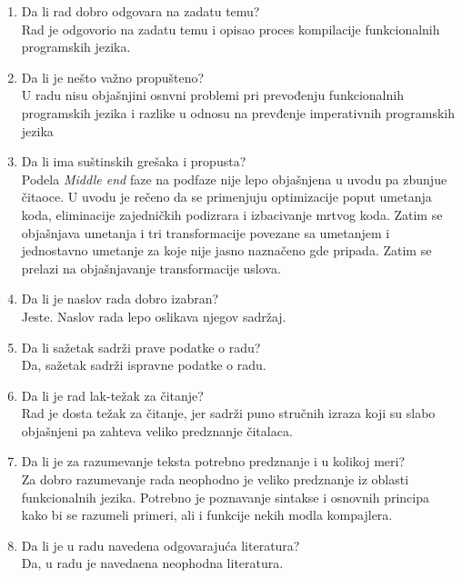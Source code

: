 \documentclass[a4paper]{report}
\begin{document}
	\begin{enumerate}
		
		\item Da li rad dobro odgovara na zadatu temu?\\
		Rad je odgovorio na zadatu temu i opisao proces kompilacije funkcionalnih programskih jezika.
		
		\item Da li je nešto važno propušteno?\\
		U radu nisu objašnjini osnvni problemi pri prevođenju funkcionalnih programskih jezika i razlike u odnosu na prevđenje imperativnih programskih jezika
		
		\item Da li ima suštinskih grešaka i propusta?\\
		Podela \emph{Middle end} faze na podfaze nije lepo objašnjena u uvodu pa zbunjue čitaoce. U uvodu je rečeno da se primenjuju  optimizacije poput umetanja koda, eliminacije zajedničkih podizrara i izbacivanje mrtvog koda. Zatim se objašnjava umetanja i tri transformacije povezane sa umetanjem i jednostavno umetanje za koje nije jasno naznačeno gde pripada. Zatim se prelazi na objašnjavanje transformacije uslova.
		
		\item Da li je naslov rada dobro izabran?\\
		Jeste. Naslov rada lepo oslikava njegov sadržaj.
		
		\item Da li sažetak sadrži prave podatke o radu?\\
		Da, sažetak sadrži ispravne podatke o radu.
		
		\item Da li je rad lak-težak za čitanje?\\
		Rad je dosta težak za čitanje, jer sadrži puno stručnih izraza koji su slabo objašnjeni pa zahteva veliko predznanje čitalaca. 
		
		\item Da li je za razumevanje teksta potrebno 
		predznanje i u kolikoj meri?\\
		Za dobro razumevanje rada neophodno je veliko predznanje iz oblasti funkcionalnih jezika. Potrebno je poznavanje sintakse i osnovnih principa kako bi se razumeli primeri, ali i funkcije nekih modla kompajlera.
		
		\item Da li je u radu navedena odgovarajuća literatura?\\
		Da, u radu je navedaena neophodna literatura.
		

\end{enumerate}
\end{document}
